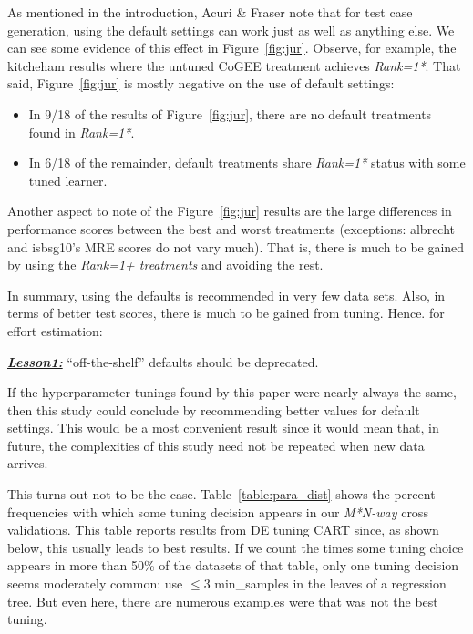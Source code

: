 \documentclass[10pt,conference]{IEEEtran}
\newcommand{\bi}{\begin{itemize}}
\newcommand{\ei}{\end{itemize}}
\newenvironment{result}[2]
{\begin{myshadowbox}\textbf{\textit{\underline{Lesson#1:}}} #2}{ 
\end{myshadowbox}}
\begin{document}
  


 
 As mentioned in the introduction, 
 Acuri \& Fraser note that for
 test case generation,   using the default settings
can work just as well as anything else. 
 We can see some evidence of this effect in  Figure~\ref{fig:jur}. Observe, for example, the
  kitcheham results where the untuned CoGEE treatment achieves {\em Rank=1*}.  
  That said,  Figure~\ref{fig:jur} is mostly negative on the use of default settings:
 \bi
 \item
In   9/18 of the results  of Figure~\ref{fig:jur}, there are
no default treatments found in  {\em Rank=1*}. 
 \item
 In 6/18 of the remainder, default
 treatments share {\em Rank=1*} status with some tuned learner. 
 \ei
 Another aspect to note of the Figure~\ref{fig:jur} results
 are the large differences in performance scores
 between the best and worst treatments (exceptions: albrecht and  isbsg10's MRE scores do not vary much). That is, there is much to be gained by using the {\em Rank=1+ treatments} and avoiding the rest.
 
 In summary,  using the defaults is recommended in very few
 data sets. Also, in terms of better test scores,
 there is much to be gained   from tuning. Hence. for effort estimation:
 
 \begin{result}{1}
``off-the-shelf'' defaults
 should be deprecated.
 \end{result}
 


 
 

 
 If the hyperparameter tunings found by this paper
 were nearly always the same, then this study
 could conclude by recommending better values
 for default settings. This would
 be a most convenient result since it would mean that,
 in future, the complexities of this study need not be repeated when new data arrives.
 
This turns out not to be the case.
Table~\ref{table:para_dist} shows the percent frequencies with which
some tuning decision appears in our {\em M*N-way} cross validations.
This table reports results from DE tuning CART since, as shown below,
this usually leads to best results.
If we count the times some tuning choice appears in more than 50\% of the datasets of that table, only one tuning decision seems moderately common: use $\le 3$ min\_samples
in the leaves of a regression tree. But even here, there are numerous examples
were that was not the best tuning.
\end{document}
